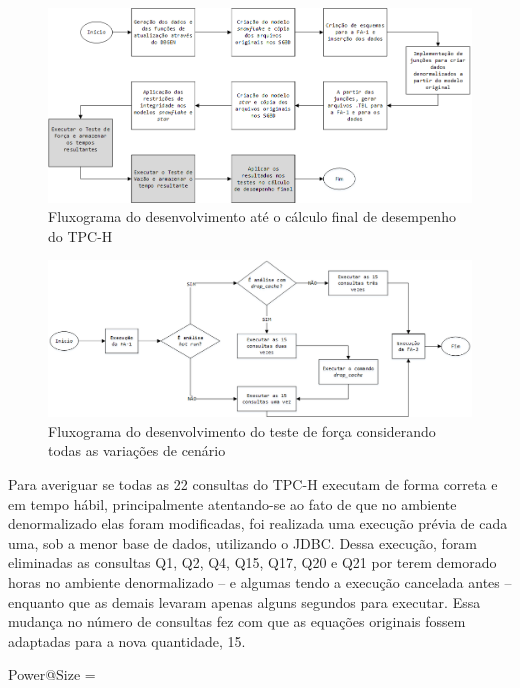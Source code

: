 \begin{figure}[htpb]
	\centering
        \includegraphics[width=\textwidth]{flux}
	\caption{Fluxograma do desenvolvimento até o cálculo final de desempenho do TPC-H}
	\label{fig:flux}
\end{figure}

\begin{figure}[htpb]
	\centering
        \includegraphics[width=\textwidth]{power_flux}
	\caption{Fluxograma do desenvolvimento do teste de força considerando todas as variações de cenário}
	\label{fig:power_flux}
\end{figure}

Para averiguar se todas as 22 consultas do TPC-H executam de forma correta e em tempo hábil, principalmente 
atentando-se ao fato de que no ambiente denormalizado elas foram modificadas, foi realizada uma execução 
prévia de cada uma, sob a menor base de dados, utilizando o JDBC. Dessa execução, foram eliminadas as consultas 
Q1, Q2, Q4, Q15, Q17, Q20 e Q21 por terem demorado horas no ambiente denormalizado -- e algumas tendo a execução 
cancelada antes -- enquanto que as demais levaram apenas alguns segundos para executar. Essa mudança no número 
de consultas fez com que as equações originais fossem adaptadas para a nova quantidade, 15.

\begin{myequation}%
\label{eq:1-2}
{\scriptstyle Power@Size} =  %
\end{myequation}
%


